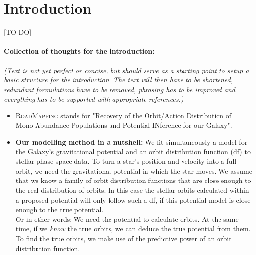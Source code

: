 \section{Introduction} \label{sec:intro}

[TO DO]

\paragraph{Collection of thoughts for the introduction:} \textit{(Text is not yet perfect or concise, but should serve as a starting point to setup a basic structure for the introduction. The text will then have to be shortened, redundant formulations have to be removed, phrasing has to be improved and everything has to be supported with appropriate references.)}
\begin{itemize}
\item \textsc{RoadMapping} stands for "Recovery of the Orbit/Action Distribution of Mono-Abundance Populations and Potential INference for our Galaxy".
\item \textbf{Our modelling method in a nutshell:} We fit simultaneously a model for the Galaxy's gravitational potential and an orbit distribution function (df) to stellar phase-space data. To turn a star's position and velocity into a full orbit, we need the gravitational potential in which the star moves. We assume that we know a family of orbit distribution functions that are close enough to the real distribution of orbits. In this case the stellar orbits calculated within a proposed potential will only follow such a df, if this potential model is close enough to the true potential.
\\Or in other words: We need the potential to calculate orbits. At the same time, if we \textit{know} the true orbits, we can deduce the true potential from them. To find the true orbits, we make use of the predictive power of an orbit distribution function.


\end{itemize}
